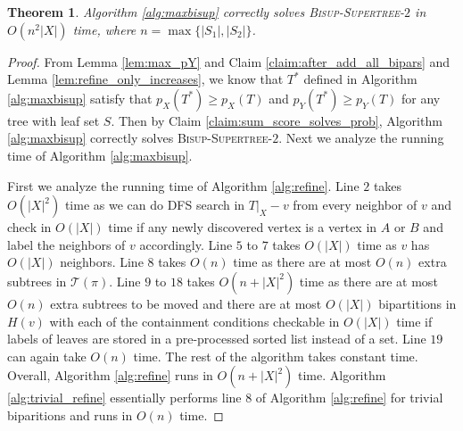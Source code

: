 \documentclass{bmcart}
\newcommand{\bisuptwo}{\textsc{Bisup-Supertree-$2$}\xspace}
\newtheorem{theorem}{Theorem}
\begin{document}
\begin{theorem}\label{thm:correctness_alg}
Algorithm \ref{alg:maxbisup} correctly solves \bisuptwo in $O(n^2|X|)$ time, where $n=\max\{|S_1|,|S_2|\}$.
\end{theorem}
\begin{proof}
From Lemma \ref{lem:max_pY} and Claim \ref{claim:after_add_all_bipars} and Lemma \ref{lem:refine_only_increases}, we know that $T^*$ defined in Algorithm \ref{alg:maxbisup} satisfy that $p_X(T^*) \ge p_X(T)$ and $p_Y(T^*) \ge p_Y(T)$ for any tree with leaf set $S$. Then by Claim \ref{claim:sum_score_solves_prob}, Algorithm \ref{alg:maxbisup} correctly solves \bisuptwo. Next we analyze the running time of Algorithm \ref{alg:maxbisup}.

First we analyze the running time of Algorithm \ref{alg:refine}. Line $2$ takes $O(|X|^2)$ time as we can do DFS search in $T|_X - v$ from every neighbor of $v$ and check in $O(|X|)$ time if any newly discovered vertex is a vertex in $A$ or $B$ and label the neighbors of $v$ accordingly. Line $5$ to $7$ takes $O(|X|)$ time as $v$ has $O(|X|)$ neighbors. Line $8$ takes $O(n)$ time as there are at most $O(n)$ extra subtrees in $\mathcal{T}(\pi)$. Line $9$ to $18$ takes $O(n+|X|^2 )$ time as there are at most $O(n)$ extra subtrees to be moved and there are at most $O(|X|)$ bipartitions in $H(v)$ with each of the containment conditions checkable in $O(|X|)$ time if labels of leaves are stored in a pre-processed sorted list instead of a set. Line $19$ can again take $O(n)$ time. The rest of the algorithm takes constant time. Overall, Algorithm \ref{alg:refine} runs in $O(n + |X|^2)$ time. Algorithm \ref{alg:trivial_refine} essentially performs line $8$ of Algorithm \ref{alg:refine} for trivial biparitions and runs in $O(n)$ time.


\end{proof}
\end{document}
